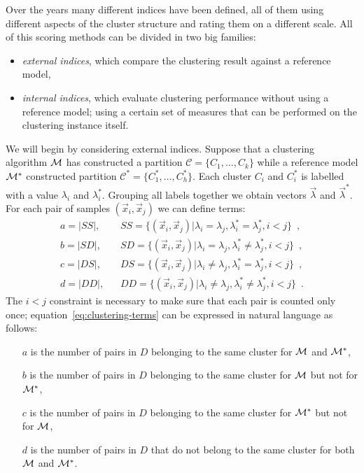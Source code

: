 Over the years many different indices have been defined, all of them using different aspects of the
cluster structure and rating them on a different scale. All of this scoring methods can be divided
in two big families:
\begin{itemize}
	\item \emph{external indices}, which compare the clustering result against a reference model,
	\item \emph{internal indices}, which evaluate clustering performance without using a
		reference model; using a certain set of measures that can be performed on the
		clustering instance itself.
\end{itemize}
We will begin by considering external indices. Suppose that a clustering algorithm $\mathcal{M}$ has
constructed a partition $\mathcal{C} = \{C_1, \ldots, C_k\}$ while a reference model $\mathcal{M}^*$
constructed partition $\mathcal{C}^*=\{C^*_1, \ldots, C^*_h\}$. Each cluster $C_i$ and $C^*_i$ is
labelled with a value $\lambda_i$ and $\lambda^*_i$. Grouping all labels together we obtain vectors
$\vec{\lambda}$ and $\vec{\lambda}^*$. For each pair of samples $(\vec{x}_i, \vec{x}_j)$ we can
define terms: 
\begin{equation}
	\label{eq:clustering-terms}
	\begin{aligned}
		a =|SS|, \hspace{10pt} &SS = \{(\vec{x}_i, \vec{x}_j) | \lambda_i = \lambda_j, \lambda^*_i =
		\lambda^*_j, i < j\} \enspace, \\
		b =|SD|, \hspace{10pt} &SD = \{(\vec{x}_i, \vec{x}_j) | \lambda_i = \lambda_j, \lambda^*_i
		\neq \lambda^*_j, i < j\} \enspace, \\
		c =|DS|, \hspace{10pt} &DS = \{(\vec{x}_i, \vec{x}_j) | \lambda_i \neq \lambda_j, \lambda^*_i =
		\lambda^*_j, i < j\} \enspace, \\
		d =|DD|, \hspace{10pt} &DD = \{(\vec{x}_i, \vec{x}_j) | \lambda_i \neq \lambda_j,
		\lambda^*_i \neq \lambda^*_j, i < j\} \enspace.
	\end{aligned}
\end{equation}
The $i < j$ constraint is necessary to make sure that each pair is counted only once; equation~\ref{eq:clustering-terms} can be expressed in natural language as follows:
\begin{itemize}
	\item[$a$] is the number of pairs in $D$ belonging to the same cluster for $\mathcal{M}$ and
		$\mathcal{M}^*$,
	\item[$b$] is the number of pairs in $D$ belonging to the same cluster for $\mathcal{M}$ but not
		for $\mathcal{M}^*$,
	\item[$c$] is the number of pairs in $D$ belonging to the same cluster for $\mathcal{M}^*$ but
		not for $\mathcal{M}$,
	\item[$d$] is the number of pairs in $D$ that do not belong to the same cluster for both
		$\mathcal{M}$ and $\mathcal{M}^*$.
\end{itemize}

